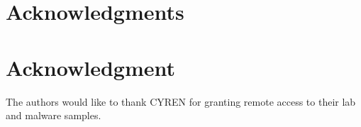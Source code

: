 \documentclass[13pt,journal,compsoc,onecolumn]{IEEEtran}
\begin{document}
%



\ifCLASSOPTIONcompsoc
 \section*{Acknowledgments}
\else
 \section*{Acknowledgment}
\fi

The authors would like to thank CYREN for granting remote access to their lab and malware samples.







\end{document}
